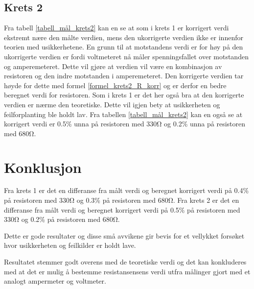\documentclass[twocolumn, a4paper, 11pt]{article} %
\begin{document}
\subsection{Krets 2}

Fra tabell \ref{tabell_mål_krets2} kan en se at som i krets 1 er korrigert verdi ekstremt nære den målte verdien, mens den ukorrigerte verdien ikke er innenfor teorien med usikkerhetene. En grunn til at motstandens verdi er for høy på den ukorrigerte verdien er fordi voltmeteret nå måler spenningsfallet over motstanden og amperemeteret. Dette vil gjøre at verdien vil være en kombinasjon av resistoren og den indre motstanden i amperemeteret. Den korrigerte verdien tar høyde for dette med formel \eqref{formel_krets2_R_korr} og er derfor en bedre beregnet verdi for resistoren. Som i krets 1 er det her også bra at den korrigerte verdien er nærme den teoretiske. Dette vil igjen bety at usikkerheten og feilforplanting ble holdt lav. Fra tabellen \ref{tabell_mål_krets2} kan en også se at korrigert verdi er 0.5\% unna på resistoren med 330$\si{\ohm}$ og 0.2\% unna på resistoren med 680$\si{\ohm}$.


\section{Konklusjon}
Fra krets 1 er det en differanse fra målt verdi og beregnet korrigert verdi på 0.4\% på resistoren med 330$\si{\ohm}$ og 0.3\% på resistoren med 680$\si{\ohm}$. Fra krets 2 er det en differanse fra målt verdi og beregnet korrigert verdi på 0.5\% på resistoren med 330$\si{\ohm}$ og 0.2\% på resistoren med 680$\si{\ohm}$.

Dette er gode resultater og disse små avvikene gir bevis for et vellykket forsøket hvor usikkerheten og feilkilder er holdt lave. 


Resultatet stemmer godt overens med de teoretiske verdi og det kan konkluderes med at det er mulig å bestemme resistansensens verdi utfra målinger gjort med et analogt ampermeter og voltmeter.




\end{document}
